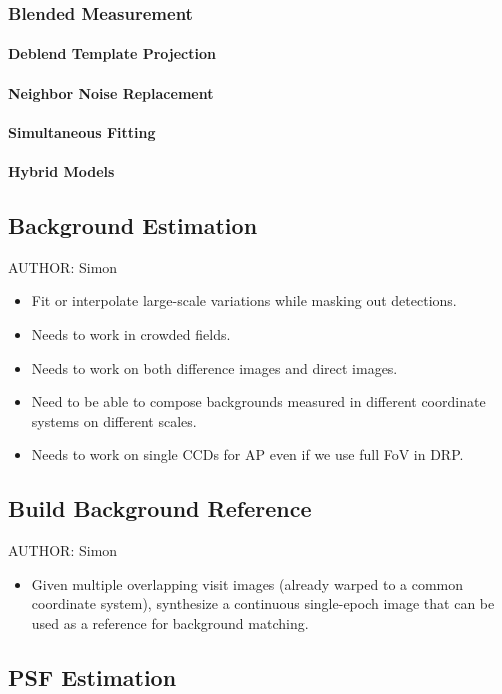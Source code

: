 \subsubsection{Blended Measurement}
\paragraph{Deblend Template Projection}
\paragraph{Neighbor Noise Replacement}
\paragraph{Simultaneous Fitting}
\paragraph{Hybrid Models}

\subsection{Background Estimation}
AUTHOR: Simon
\begin{itemize}
\item Fit or interpolate large-scale variations while masking out detections.
\item Needs to work in crowded fields.
\item Needs to work on both difference images and direct images.
\item Need to be able to compose backgrounds measured in different coordinate systems on different scales.
\item Needs to work on single CCDs for AP even if we use full FoV in DRP.
\end{itemize}

\subsection{Build Background Reference}
AUTHOR: Simon
\begin{itemize}
\item Given multiple overlapping visit images (already warped to a common coordinate system), synthesize a continuous single-epoch image that can be used as a reference for background matching.
\end{itemize}

\subsection{PSF Estimation}

